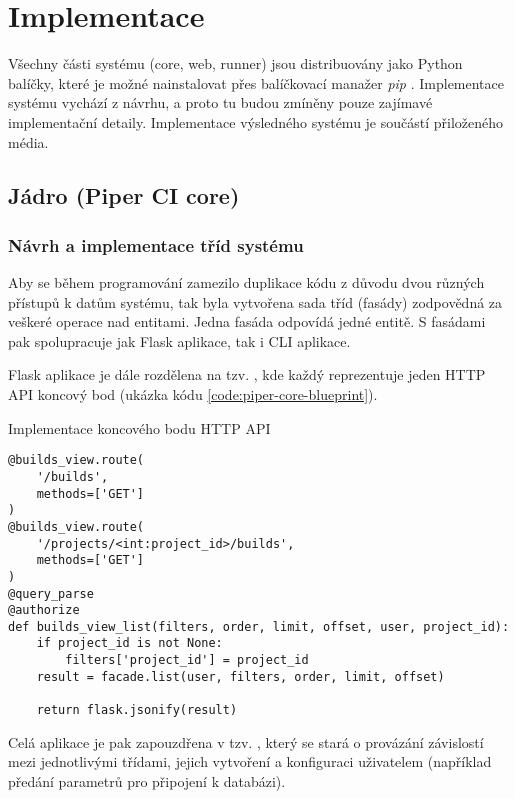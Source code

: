 \chapter{Implementace}

Všechny části systému (core, web, runner) jsou distribuovány jako Python balíčky, které je možné nainstalovat přes balíčkovací manažer \textit{pip} \cite{python_pip}.
Implementace systému vychází z návrhu, a proto tu budou zmíněny pouze zajímavé implementační detaily.
Implementace výsledného systému je součástí přiloženého média.

\section{Jádro (Piper CI core)}

\subsection{Návrh a implementace tříd systému}


Aby se během programování zamezilo duplikace kódu z důvodu dvou různých přístupů k datům systému, tak byla vytvořena sada tříd (fasády) zodpovědná za veškeré operace nad entitami.
Jedna fasáda odpovídá jedné entitě.
S fasádami pak spolupracuje jak Flask aplikace, tak i CLI aplikace.

Flask aplikace je dále rozdělena na tzv. , kde každý reprezentuje jeden HTTP API koncový bod (ukázka kódu \ref{code:piper-core-blueprint}).

\begin{listing}[ht]
\caption{\label{code:piper-core-blueprint}Implementace koncového bodu HTTP API}
\begin{verbatim}
@builds_view.route(
    '/builds',
    methods=['GET']
)
@builds_view.route(
    '/projects/<int:project_id>/builds',
    methods=['GET']
)
@query_parse
@authorize
def builds_view_list(filters, order, limit, offset, user, project_id):
    if project_id is not None:
        filters['project_id'] = project_id
    result = facade.list(user, filters, order, limit, offset)

    return flask.jsonify(result)
\end{verbatim}
\end{listing}

Celá aplikace je pak zapouzdřena v tzv. , který se stará o provázání závislostí mezi jednotlivými třídami, jejich vytvoření a konfiguraci uživatelem (například předání parametrů pro připojení k databázi).

